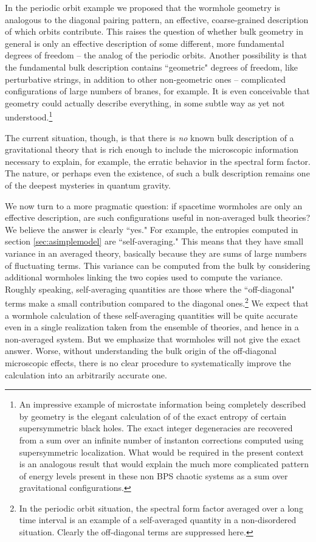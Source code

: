 \documentclass[11pt]{article}
\numberwithin{equation}{section}
\begin{document}
In the periodic orbit example we proposed that the wormhole geometry is  analogous  to the diagonal pairing pattern, an effective, coarse-grained description of which orbits contribute.   This raises the question of whether bulk geometry in general is only an effective description of some different, more fundamental degrees of freedom -- the analog of the periodic orbits.   Another possibility is that the fundamental bulk description contains ``geometric" degrees of freedom, like perturbative strings, in addition to other non-geometric ones -- complicated configurations of large numbers of branes, for example.  It is even conceivable that geometry could actually describe everything, in some subtle way as yet not understood.\footnote{An impressive example of microstate information being completely  described by geometry is the elegant calculation of \cite{Dabholkar:2014ema}  of the exact entropy of certain supersymmetric black holes.  The exact integer degeneracies are recovered from a sum over an infinite number of instanton corrections computed using supersymmetric localization.    What would be required in the present context is an analogous result that would explain the much more complicated pattern of energy levels present in these non BPS chaotic systems as a sum over gravitational configurations.}   
 
 The current situation, though,  is that there is \emph{no} known  bulk description of a gravitational theory that is  rich enough to include the microscopic information necessary to explain, for example,  the erratic behavior in the spectral form factor.   The nature, or perhaps even the existence, of such a bulk description remains one of the deepest mysteries in quantum gravity.

We now turn to a more pragmatic question:  if  spacetime wormholes are only an effective description, are such  configurations useful in non-averaged bulk theories?  We believe the answer is clearly ``yes."      For example, the entropies computed in  section \ref{sec:asimplemodel} are ``self-averaging."  This means that they  have small variance in an averaged theory,  basically because they are sums of large numbers of fluctuating terms.  This variance can be computed from the bulk by considering additional wormholes linking the two copies used to compute the variance.    Roughly speaking, 
self-averaging quantities are those  where the ``off-diagonal" terms make a small contribution compared to the diagonal ones.\footnote{In the periodic orbit situation, the spectral form factor averaged over a long time interval is an example of a self-averaged quantity in a non-disordered situation. Clearly the off-diagonal terms are suppressed here.} We expect that a wormhole calculation of these self-averaging quantities will be quite accurate even in a single realization taken from  the ensemble of theories, and hence in a non-averaged system.    But we emphasize that wormholes will not give the exact answer.  Worse, without understanding the bulk origin of the off-diagonal microscopic effects, there is no clear procedure to systematically  improve the calculation into an arbitrarily accurate one.   
\end{document}
